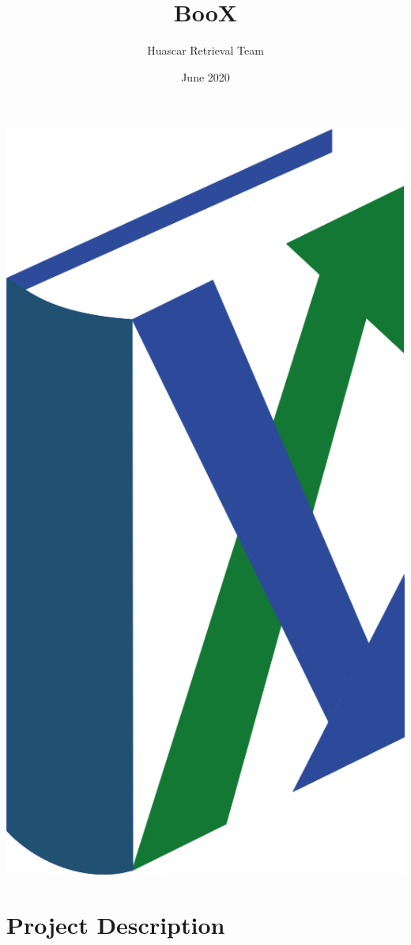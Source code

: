 \documentclass{article}
\title{BooX}
\author{Huascar Retrieval Team}
\date{June 2020}
\begin{document}
\maketitle
\begin{center}
    \includegraphics[scale=0.1]{img/logo.png}
\end{center}
\section{Project Description} %
\end{document}

